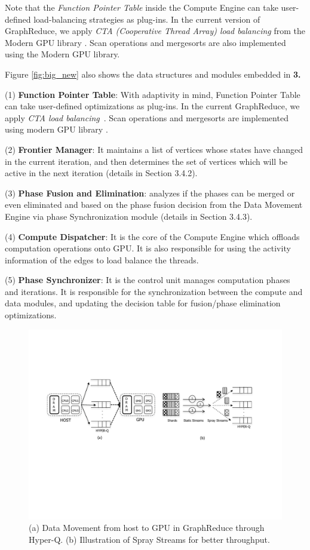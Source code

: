 Note that the \textit{Function Pointer Table} inside the Compute Engine can take user-defined load-balancing strategies as plug-ins. In the current version of GraphReduce, we apply \textit{CTA (Cooperative Thread Array) load balancing} from the Modern GPU library \cite{moderngpu}. Scan operations and mergesorts are also implemented using the Modern GPU library.


Figure \ref{fig:big_new} also shows the data structures and modules embedded in \textbf{3.} 

(1) {\bf Function Pointer Table}: With adaptivity in mind, Function Pointer Table can take user-defined optimizations as plug-ins. In the current GraphReduce, we apply \textit{CTA load balancing}~\cite{moderngpu}. Scan operations and mergesorts are implemented using modern GPU library \cite{moderngpu}.

(2) {\bf Frontier Manager}: It maintains a list of vertices whose states have changed in the current iteration, and then determines the set of vertices which will be active in the next iteration (details in Section 3.4.2).  

(3) {\bf Phase Fusion and Elimination}:  analyzes if the phases can be merged or even eliminated and based on the phase fusion decision from the Data Movement Engine via phase Synchronization module (details in Section 3.4.3).

(4) {\bf Compute Dispatcher}: It is the core of the Compute Engine which offloads computation operations onto GPU. It is also responsible for using the activity information of the edges to load balance the threads.

(5) {\bf Phase Synchronizer}: It is the control unit manages computation phases and iterations. It is responsible for the synchronization between the compute and data modules, and updating the decision table for fusion/phase elimination optimizations.


\begin{figure}[!t]
\centering
\includegraphics[width=\textwidth,height=\textheight,keepaspectratio]{figures/hyperq.pdf}
\caption{(a) Data Movement from host to GPU in GraphReduce through Hyper-Q. (b) Illustration of Spray Streams for better throughput.}
\label{fig:hyperq}
\end{figure}

